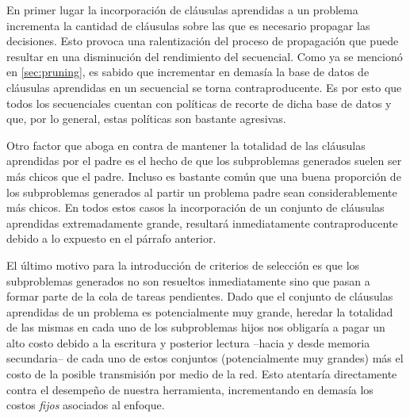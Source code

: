 En primer lugar la incorporación de cláusulas aprendidas a un problema
incrementa la cantidad de cláusulas sobre las que es necesario propagar las
decisiones. Esto provoca una ralentización del proceso de propagación que
puede resultar en una disminución del rendimiento del \ssolver secuencial.
Como ya se mencionó en \ref{sec:pruning}, es sabido que incrementar en demasía
la base de datos de cláusulas aprendidas en un \ssolver secuencial se torna
contraproducente. Es por esto que todos los \ssolvers \CDCL secuenciales
cuentan con políticas de recorte de dicha base de datos y que, por lo general,
estas políticas son bastante agresivas.

Otro factor que aboga en contra de mantener la totalidad de las cláusulas
aprendidas por el padre es el hecho de que los subproblemas generados suelen
ser más chicos que el padre. Incluso es bastante común que una buena
proporción de los subproblemas generados al partir un problema padre sean
considerablemente más chicos. En todos estos casos la incorporación de un
conjunto de cláusulas aprendidas extremadamente grande, resultará
inmediatamente contraproducente debido a lo expuesto en el párrafo anterior.

El último motivo para la introducción de criterios de selección es que los
subproblemas generados no son resueltos inmediatamente sino que pasan a formar
parte de la cola de tareas pendientes. Dado que el conjunto de cláusulas
aprendidas de un problema es potencialmente muy grande, heredar la totalidad
de las mismas en cada uno de los subproblemas hijos nos obligaría a pagar un
alto costo debido a la escritura y posterior lectura --hacia y desde memoria
secundaria-- de cada uno de estos conjuntos (potencialmente muy grandes) más
el costo de la posible transmisión por medio de la red. Esto atentaría
directamente contra el desempeño de nuestra herramienta, incrementando en
demasía los costos \emph{fijos} asociados al enfoque.


